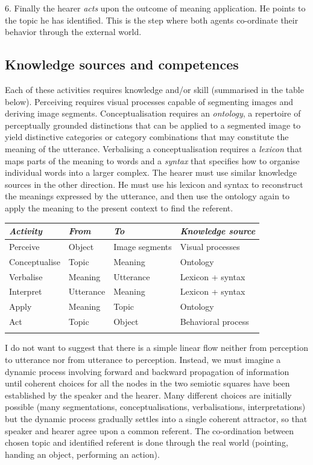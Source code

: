 6. Finally the hearer {\it acts} upon the outcome of meaning
application. He points to the topic he has identified. This is the 
step where both agents co-ordinate their 
behavior through the external world. 

\subsection{Knowledge sources and competences}

Each of these activities requires knowledge and/or skill
(summarised in the table below). Perceiving requires 
visual processes capable of segmenting images and deriving image 
segments. Conceptualisation requires an {\it ontology}, 
a repertoire of perceptually grounded distinctions
that can be applied to a segmented image to yield 
distinctive categories or category combinations that 
may constitute the meaning of the utterance. Verbalising 
a conceptualisation requires 
a {\it lexicon} that maps parts of the meaning to words and 
a {\it syntax} that specifies how to organise individual words
into a larger complex. 
The hearer must use similar 
knowledge sources in the other direction. He must use 
his lexicon and syntax to reconstruct the meanings expressed
by the utterance, and then use the 
ontology again to apply the meaning to the present 
context to find the referent. 
\begin{center}
\begin{tabular}{ l  l  l  l }
\lsptoprule
{\it Activity} & {\it From} & {\it To} & {\it Knowledge source}\\ \midrule
Perceive & Object & Image segments & Visual processes \\ \midrule
Conceptualise & Topic & Meaning & Ontology  \\ \midrule
Verbalise & Meaning & Utterance & Lexicon + syntax \\ \midrule \midrule
Interpret & Utterance & Meaning & Lexicon + syntax \\ \midrule
Apply & Meaning & Topic & Ontology \\ \midrule
Act & Topic & Object & Behavioral process  \\ \midrule
\lspbottomrule
\end{tabular}
\end{center}

I do not want to suggest that there is a simple linear flow 
neither from perception to utterance nor from utterance to 
perception. Instead, we must imagine a dynamic process 
involving forward and backward propagation of information 
until coherent choices for all the nodes in the two
semiotic squares have been established by the speaker and 
the hearer. Many different choices are initially possible 
(many segmentations, conceptualisations, verbalisations, 
interpretations) but the dynamic process gradually settles into 
a single coherent attractor, so that speaker and hearer 
agree upon a common referent. The co-ordination between 
chosen topic and identified referent is done through 
the real world (pointing, handing an object, performing
an action). 

